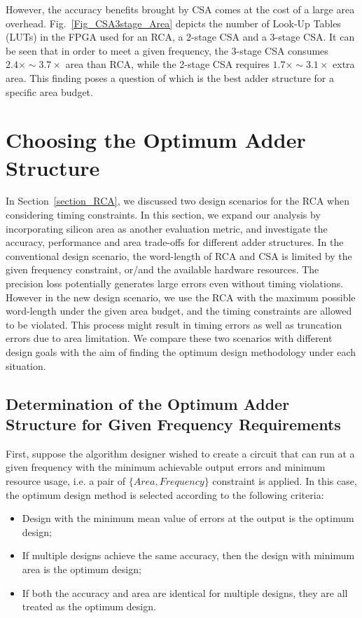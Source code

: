 \documentclass[prodmode,acmtrets]{acmsmall} %
\begin{document}
However, the accuracy benefits brought by CSA comes at the cost of a large area overhead. Fig.~\ref{Fig_CSA3stage_Area} depicts the number of Look-Up Tables (LUTs) in the FPGA used for an RCA, a 2-stage CSA and a 3-stage CSA. It can be seen that in order to meet a given frequency, the 3-stage CSA consumes $2.4\times\sim3.7\times$ area than RCA, while the 2-stage CSA requires $1.7\times\sim3.1\times$ extra area. This finding poses a question of which is the best adder structure for a specific area budget.

\section{Choosing the Optimum Adder Structure}\label{Section_OptimumAdder}
In Section~\ref{section_RCA}, we discussed two design scenarios for the RCA when considering timing constraints. In this section, we expand our analysis by incorporating silicon area as another evaluation metric, and investigate the accuracy, performance and area trade-offs for different adder structures. In the conventional design scenario, the word-length of RCA and CSA is limited by the given frequency constraint, or/and the available hardware resources. The precision loss potentially generates large errors even without timing violations. However in the new design scenario, we use the RCA with the maximum possible word-length under the given area budget, and the timing constraints are allowed to be violated. This process might result in timing errors as well as truncation errors due to area limitation. We compare these two scenarios with different design goals with the aim of finding the optimum design methodology under each situation.

\subsection{Determination of the Optimum Adder Structure for Given Frequency Requirements}
First, suppose the algorithm designer wished to create a circuit that can run at a given frequency with the minimum achievable output errors and minimum resource usage, i.e. a pair of $\{Area, Frequency\}$ constraint is applied. In this case, the optimum design method is selected according to the following criteria:

\begin{itemize}
  \item Design with the minimum mean value of errors at the output is the optimum design;
  \item If multiple designs achieve the same accuracy, then the design with minimum area is the optimum design;
  \item If both the accuracy and area are identical for multiple designs, they are all treated as the optimum design.
\end{itemize}
\end{document}
